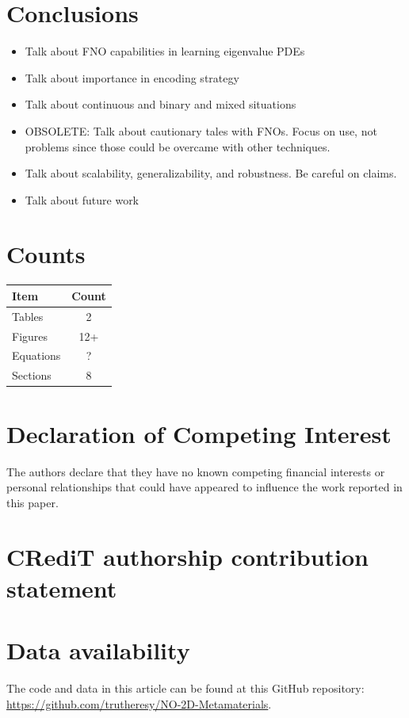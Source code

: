 \documentclass[preprint,review,12pt]{elsarticle}
\begin{document}
\section{Conclusions}
\label{sec:Conclusion}
\begin{itemize}[noitemsep]
\item Talk about FNO capabilities in learning eigenvalue PDEs
\item Talk about importance in encoding strategy
\item Talk about continuous and binary and mixed situations
\item OBSOLETE: Talk about cautionary tales with FNOs. Focus on use, not problems since those could be overcame with other techniques.
\item Talk about scalability, generalizability, and robustness. Be careful on claims.
\item Talk about future work
\end{itemize}

\section*{Counts}
\begin{tabular}{l c}
\hline
Item & Count \\
\hline
Tables   & 2 \\
Figures  & 12+ \\
Equations& ? \\
Sections & 8\\
\hline
\end{tabular}

\section*{Declaration of Competing Interest}
The authors declare that they have no known competing financial interests or personal relationships that could have appeared to influence the work reported in this paper.

\section*{CRediT authorship contribution statement}


\section*{Data availability}
\label{sec:Repository}
The code and data in this article can be found at this GitHub repository:
\url{https://github.com/trutheresy/NO-2D-Metamaterials}.
\end{document}
